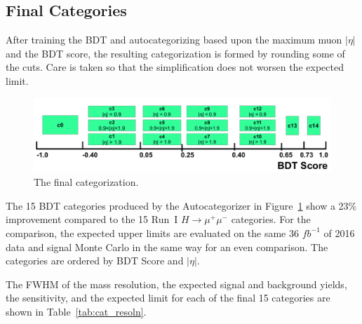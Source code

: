 \FloatBarrier
\subsection{Final Categories}

After training the BDT and autocategorizing based upon the maximum muon $|\eta|$ and the BDT score, the resulting categorization is
formed by rounding some of the cuts. Care is taken so that the simplification does not worsen the
expected limit. 
\begin{figure}[h!]
  \centering
  \includegraphics[width=1.0\linewidth]{images/bdt_cats/final_categories_symb-eta.png}
  \caption[The final categorization.]
   {The final categorization.}
  \label{fig:final_categories}
\end{figure}
The 15 BDT categories produced by the Autocategorizer in Figure~\ref{fig:final_categories}
show a 23\% improvement compared to the 15 Run~I $H\rightarrow\mu^+\mu^-$ categories.
For the comparison, the expected upper limits are evaluated on the same 36 $fb^{-1}$ of 2016 data and signal Monte Carlo in the
same way for an even comparison. The categories are ordered by BDT Score and $|\eta|$.

The FWHM of the mass resolution, the expected signal and background
yields, the sensitivity, and the expected limit for each of the final 15 categories are
shown in Table~\ref{tab:cat_resoln}.

